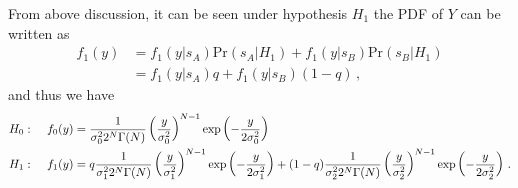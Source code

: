 From above discussion, it can be seen under hypothesis $H_1$ the PDF of $Y$ can be written as
\begin{equation}
  \begin{split}
    f_1(y) &= f_1(y|s_A)\text{Pr}(s_A|H_1) + f_1(y|s_B)\text{Pr}(s_B|H_1)\\
         &= f_1(y|s_A)q + f_1(y|s_B)(1-q)\,,
\end{split}
  \label{20150621a7}
\end{equation}
and thus we have
\begin{equation}
  \begin{split}
    H_0:\;\;\;\;\;&f_0(y) = \CHISQUY[\sigma_0^2]\\
    H_1:\;\;\;\;\;&f_1(y) = q\CHISQUY[\sigma_1^2] + (1-q)\CHISQUY[\sigma_2^2]\,.
  \end{split}
  \label{20150621a81}
\end{equation}

